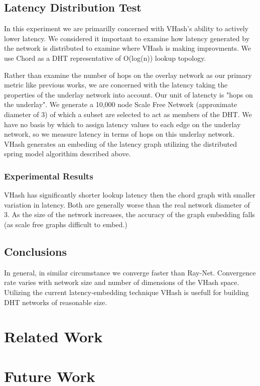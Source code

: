 \documentclass{IEEEtran}
\begin{document}
\subsection{Latency Distribution Test}
In this experiment we are primarilly concerned with VHash's ability to actively lower latency.
We considered it important to examine how latency generated by the network is distributed to examine where VHash is making improvments.
We use Chord as a DHT representative of O(log(n)) lookup topology.

Rather than examine the number of hops on the overlay network as our primary metric like previous works, we are concerned with the latency taking the properties of the underlay network into account.
Our unit of latencty is "hops on the underlay".
We generate a 10,000 node Scale Free Network (approximate diameter of 3) of which a subset are selected to act as members of the DHT.
We have no basis by which to assign latency values to each edge on the underlay network, so we measure latency in terms of hops on this underlay network.
VHash generates an embeding of the latency graph utilizing the distributed spring model algorithim described above.

\subsubsection{Experimental Results}
VHash has significantly shorter lookup latency then the chord graph with smaller variation in latency.
Both are generally worse than the real network diameter of 3.
As the size of the network increases, the accuracy of the graph embedding falls (as scale free graphs difficult to embed.)

\subsection{Conclusions}
In general, in similar circumstance we converge faster than Ray-Net.
Convergence rate varies with network size and number of dimensions of the VHash space.
Utilizing the current latency-embedding technique VHash is usefull for building DHT networks of reasonable size.

\section{Related Work}

\section{Future Work}



\end{document}
